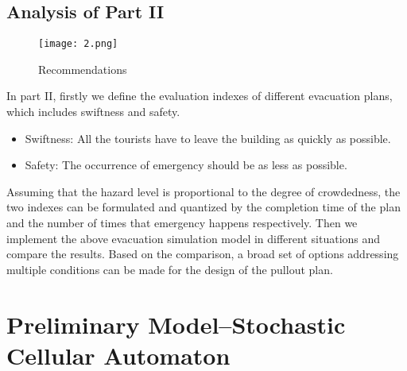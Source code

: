 \documentclass{mcmthesis}
\begin{document}
\subsection{Analysis of Part II}
\begin{figure}[htbp]
	\centering
	\caption{Recommendations}
	\texttt{[image: 2.png]}
\end{figure}
\noindent In part II, firstly we define the  evaluation indexes of different evacuation plans, which includes swiftness and safety.\\
\begin{itemize}
	\item Swiftness: All the tourists have to leave the building as quickly as possible.
	\item Safety: The occurrence of emergency should be as less as possible.
\end{itemize}
\quad Assuming that the hazard level is proportional to the degree of crowdedness, the two indexes can be formulated and quantized by the completion time of the plan and the  number of times  that emergency happens respectively. Then we implement the above evacuation simulation model in different situations and compare the results. Based on the comparison, a broad set of options addressing multiple conditions can be made for the design of the pullout plan.
\clearpage
\section{Preliminary Model--Stochastic Cellular Automaton}
\end{document}
